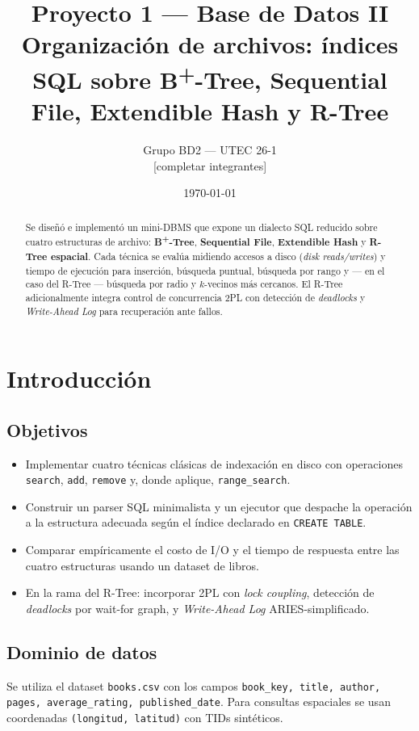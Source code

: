 \documentclass[11pt,a4paper]{article}
\title{\textbf{Proyecto 1 — Base de Datos II}\\[0.4em]
\large Organización de archivos: índices SQL sobre B\textsuperscript{+}-Tree, Sequential File, Extendible Hash y R-Tree}
\author{Grupo BD2 — UTEC 26-1\\\small{[completar integrantes]}}
\date{\today}
\begin{document}
\maketitle

\begin{abstract}
Se diseñó e implementó un mini-DBMS que expone un dialecto SQL reducido
sobre cuatro estructuras de archivo: \textbf{B\textsuperscript{+}-Tree},
\textbf{Sequential File}, \textbf{Extendible Hash} y \textbf{R-Tree
espacial}. Cada técnica se evalúa midiendo accesos a disco
(\emph{disk reads/writes}) y tiempo de ejecución para inserción, búsqueda
puntual, búsqueda por rango y --- en el caso del R-Tree --- búsqueda por
radio y $k$-vecinos más cercanos. El R-Tree adicionalmente integra control
de concurrencia 2PL con detección de \emph{deadlocks} y \emph{Write-Ahead
Log} para recuperación ante fallos.
\end{abstract}

\section{Introducción}

\subsection{Objetivos}
\begin{itemize}[nosep]
    \item Implementar cuatro técnicas clásicas de indexación en disco con
    operaciones \texttt{search}, \texttt{add}, \texttt{remove} y, donde
    aplique, \texttt{range\_search}.
    \item Construir un parser SQL minimalista y un ejecutor que despache la
    operación a la estructura adecuada según el índice declarado en
    \texttt{CREATE TABLE}.
    \item Comparar empíricamente el costo de I/O y el tiempo de respuesta
    entre las cuatro estructuras usando un dataset de libros.
    \item En la rama del R-Tree: incorporar 2PL con \emph{lock coupling},
    detección de \emph{deadlocks} por wait-for graph, y \emph{Write-Ahead
    Log} ARIES-simplificado.
\end{itemize}

\subsection{Dominio de datos}
Se utiliza el dataset \texttt{books.csv} con los campos
\texttt{book\_key, title, author, pages, average\_rating,
published\_date}. Para consultas espaciales se usan coordenadas
\texttt{(longitud, latitud)} con TIDs sintéticos.
\end{document}
